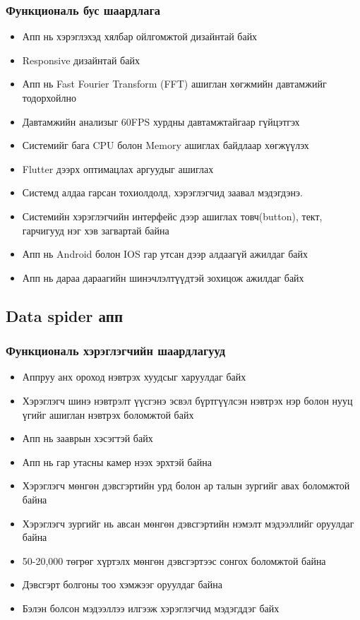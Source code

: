       \subsubsection{Функциональ бус шаардлага}
        \begin{itemize}
            \item Апп нь хэрэглэхэд хялбар ойлгомжтой дизайнтай байх
            \item Responsive дизайнтай байх
            \item Апп нь Fast Fourier Transform (FFT) ашиглан хөгжмийн давтамжийг тодорхойлно
            \item Давтамжийн анализыг 60FPS хурдны давтамжтайгаар гүйцэтгэх
            \item Системийг бага CPU болон Memory ашиглах байдлаар хөгжүүлэх
            \item Flutter дээрх оптимацлах аргуудыг ашиглах
            \item Системд алдаа гарсан тохиолдолд, хэрэглэгчид заавал мэдэгдэнэ.
            \item Системийн хэрэглэгчийн интерфейс дээр ашиглах товч(button), тект, гарчигууд нэг хэв загвартай байна
            \item Апп нь Android болон IOS гар утсан дээр алдаагүй ажилдаг байх
            \item Апп нь дараа дараагийн шинэчлэлтүүдтэй зохицож ажилдаг байх
        \end{itemize}
    \subsection{Data spider апп}
        \subsubsection{Функциональ хэрэглэгчийн шаардлагууд}
             \begin{itemize}
                \item Аппруу анх ороход нэвтрэх хуудсыг харуулдаг байх
                \item Хэрэглэгч шинэ нэвтрэлт үүсгэнэ эсвэл бүртгүүлсэн нэвтрэх нэр болон нууц үгийг ашиглан нэвтрэх боломжтой байх
                \item Апп нь зааврын хэсэгтэй байх
                \item Апп нь гар утасны камер нээх эрхтэй байна
                \item Хэрэглэгч мөнгөн дэвсгэртийн урд болон ар талын зургийг авах боломжтой байна
                \item Хэрэглэгч зургийг нь авсан мөнгөн дэвсгэртийн нэмэлт мэдээллийг оруулдаг байна
                \item 50-20,000 төгрөг хүртэлх мөнгөн дэвсгэртээс сонгох боломжтой байна
                \item Дэвсгэрт болгоны тоо хэмжээг оруулдаг байна
                \item Бэлэн болсон мэдээллээ илгээж хэрэглэгчид мэдэгддэг байх
            \end{itemize}
